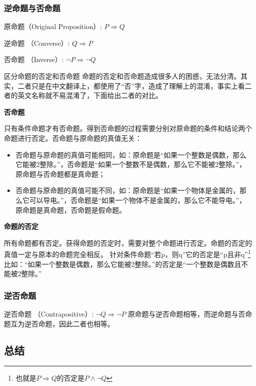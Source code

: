 \subsubsection{逆命题与否命题}

原命题（Original Proposition）:  $P \Rightarrow Q $

逆命题 （Converse）:  $Q \Rightarrow P$ 

否命题 （Inverse）:  $\neg P \Rightarrow \neg Q $


\begin{example}{区分命题的否定和否命题}
命题的否定和否命题造成很多人的困惑，无法分清。其实，二者只是在中文翻译上，都使用了“否”字，造成了理解上的混淆，事实上看二者的英文名称就不易混淆了，下面给出二者的对比。

\textbf{否命题}

只有条件命题才有否命题。得到否命题的过程需要分别对原命题的条件和结论两个命题进行否定。否命题与原命题的真值无关：
\begin{itemize}
\item 否命题与原命题的真值可能相同，如：原命题是“如果一个整数是偶数，那么它能被2整除。”，否命题是“如果一个整数不是偶数，那么它不能被2整除。”，原命题与否命题都是真命题；
\item 否命题与原命题的真值可能不同，如：原命题是“如果一个物体是金属的，那么它可以导电。”，否命题是“如果一个物体不是金属的，那么它不能导电。”，原命题是真命题，否命题是假命题。
\end{itemize}

\textbf{命题的否定}

所有命题都有否定。获得命题的否定时，需要对整个命题进行否定。命题的否定的真值一定与原本的命题完全相反。
针对条件命题“若p，则q”它的否定是“p且非q”\footnote{也就是$P\Rightarrow Q$的否定是$P\land\neg Q$}
比如：“如果一个整数是偶数，那么它能被2整除。”的否定是“一个整数是偶数且不能被2整除。”

\end{example}

\subsubsection{逆否命题}

逆否命题 （Contrapositive）:  $\neg Q \Rightarrow \neg P $
原命题与逆否命题相等，而逆命题与否命题互为逆否命题，因此二者也相等。


\subsection{总结}

